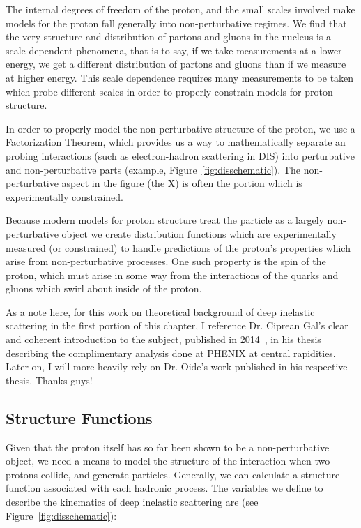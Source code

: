 The internal degrees of freedom of the proton, and the small scales involved
make models for the proton fall generally into non-perturbative regimes. We find
that the very structure and distribution of partons and gluons in the nucleus is
a scale-dependent phenomena, that is to say, if we take measurements at a lower
energy, we get a different distribution of partons and gluons than if we measure
at higher energy. This scale dependence requires many measurements to be taken
which probe different scales in order to properly constrain models for proton
structure. 

In order to properly model the non-perturbative structure of the proton, we use
a Factorization Theorem, which provides us a way to mathematically separate an
probing interactions (such as electron-hadron scattering in DIS) into
perturbative and non-perturbative parts (example,
Figure~\ref{fig:disschematic}). The non-perturbative aspect in the figure (the
X) is often the portion which is experimentally constrained.

Because modern models for proton structure treat the particle as a largely
non-perturbative object we create distribution functions which are
experimentally measured (or constrained) to handle predictions of the proton's
properties which arise from non-perturbative processes. One such property is the
spin of the proton, which must arise in some way from the interactions of the
quarks and gluons which swirl about inside of the proton.

As a note here, for this work on theoretical background of deep inelastic
scattering in the first portion of this chapter, I reference Dr. Ciprean Gal's
clear and coherent introduction to the subject, published in
2014~\cite{Gal2014b}, in his thesis describing the complimentary analysis done
at PHENIX at central rapidities. Later on, I will more heavily rely on Dr.
Oide's work published in his respective thesis.  Thanks guys!

\subsection{Structure Functions}
\label{sec:structure_functions}

Given that the proton itself has so far been shown to be a non-perturbative
object, we need a means to model the structure of the interaction when two
protons collide, and generate particles.  Generally, we can calculate a
structure function associated with each hadronic process. The variables we
define to describe the kinematics of deep inelastic scattering are (see
Figure~\ref{fig:disschematic}):

